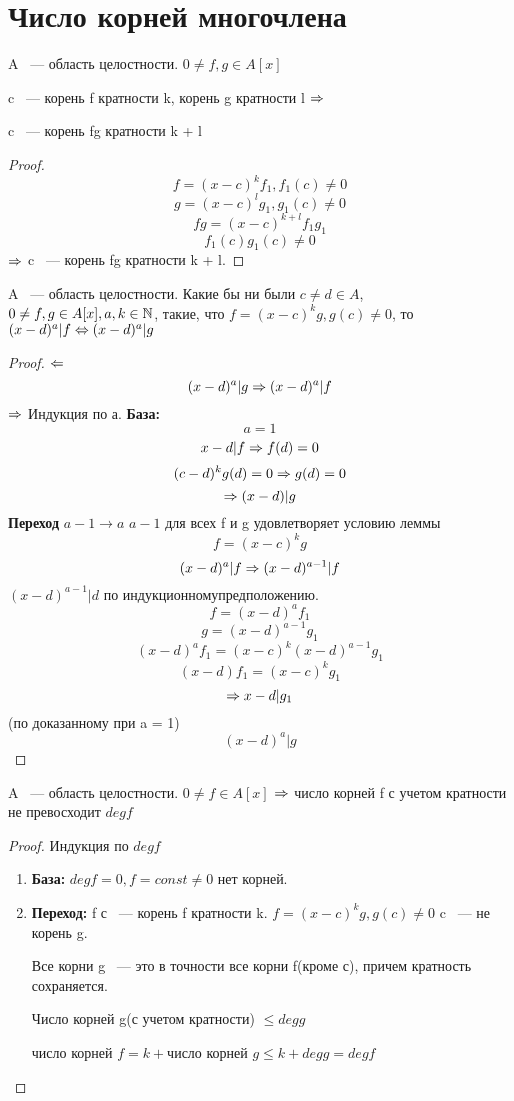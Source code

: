﻿\section{Число корней многочлена}
\begin{lemma}
A ~--- область целостности. $0 \ne f, g \in A[x]$

c ~--- корень f кратности k, корень g кратности l $\Rightarrow$

c ~--- корень fg кратности k + l
\end{lemma}

\begin{proof}
$$f = (x - c)^kf_1, f_1(c) \ne 0$$
$$g = (x - c)^lg_1, g_1(c) \ne 0$$
$$fg = (x - c)^{k + l}f_1g_1$$
$$f_1(c)g_1(c) \ne 0$$
$\Rightarrow$ c ~--- корень fg кратности k + l.
\end{proof}

\begin{lemma}
A ~--- область целостности. 
Какие бы ни были $c \ne d \in A$, $0 \ne f, g \in A[x], a, k \in \mathbb{N}$, такие, что $f = (x - c)^{k}g, g(c) \ne 0$, то
$(x - d)^{a}|f \Leftrightarrow (x - d)^{a}|g$
\end{lemma}

\begin{proof}
$\Leftarrow$
$$ (x - d)^{a}|g \Rightarrow (x - d)^{a}|f$$
$\Rightarrow$
Индукция по а.
{\bf База:}
$$a = 1$$
$$x - d|f \Rightarrow f(d) = 0$$
$$(c - d)^kg(d) = 0 \Rightarrow g(d) = 0$$
$$\Rightarrow (x - d)|g$$
{\bf Переход} $a - 1 \to a$
$a - 1$ для всех f и g удовлетворяет условию леммы
$$f = (x - c)^{k}g$$
$$(x - d)^{a}|f \Rightarrow (x - d)^{a - 1}|f$$
$(x - d)^{a - 1}|d$ по индукционномупредположению.
$$f = (x - d)^{a}f_1$$
$$g = (x - d)^{a - 1}g_1$$
$$(x - d)^af_1 = (x - c)^{k}(x - d)^{a - 1}g_1$$
$$(x - d)f_1 = (x - c)^kg_1$$
$$\Rightarrow x - d|g_1$$
(по доказанному при a = 1)
$$(x - d)^{a}|g$$  
\end{proof}

\begin{theorem}{}
 A ~--- область целостности. $0 \ne f \in A[x]$
 $\Rightarrow$ число корней f с учетом кратности не превосходит $deg f$
\end{theorem}
\begin{proof}
Индукция по $deg f$
\begin{enumerate}
\item {\bf База:} $deg f = 0, f = const \ne 0$
нет корней.
\item {\bf Переход:} f с ~--- корень f кратности k.
$f = (x - c)^{k}g, g(c) \ne 0$ c ~--- не корень g. 

Все корни g ~--- это в точности все корни f(кроме с), причем кратность сохраняется. 

Число корней g(с учетом кратности) $\le deg g$

число корней $f = k + $число корней $g \le k + deg g = deg f$
\end{enumerate}

\end{proof}

